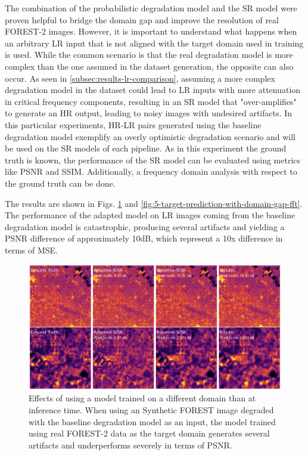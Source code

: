         The combination of the probabilistic degradation model and the SR model were proven helpful to bridge the domain gap and improve the resolution of real FOREST-2 images.
        However, it is important to understand what happens when an arbitrary LR input that is not aligned with the target domain used in training is used.
        While the common scenario is that the real degradation model is more complex than the one assumed in the dataset generation, the opposite can also occur.
        As seen in \ref{subsec:results-lr-comparison}, assuming a more complex degradation model in the dataset could lead to LR inputs with more attenuation in critical frequency components, resulting in an SR model that "over-amplifies" to generate an HR output, leading to noisy images with undesired artifacts.
        In this particular experiments, HR-LR pairs generated using the baseline degradation model exemplify an overly optimistic degradation scenario and will be used on the SR models of each pipeline.
        As in this experiment the ground truth is known, the performance of the SR model can be evaluated using metrics like PSNR and SSIM. Additionally, a frequency domain analysis with respect to the ground truth can be done.
        
        The results are shown in Figs. \ref{fig:5-target-prediction-with-domain-gap} and \ref{fig:5-target-prediction-with-domain-gap-fft}.
        The performance of the adapted model on LR images coming from the baseline degradation model is catastrophic, producing several artifacts and yielding a PSNR difference of approximately 10dB, which represent a 10x difference in terms of MSE.

        \begin{figure}[H]
            \centering
            \includegraphics[scale=0.28]{Includes/5-target_prediction_sample-with-domain-gap.pdf}
            \caption{Effects of using a model trained  on a different domain than at inference time. 
                     When using an Synthetic FOREST image degraded with the baseline degradation model as an input, the model trained using real FOREST-2 data as the target domain generates several artifacts and underperforms severely in terms of PSNR. }
            \label{fig:5-target-prediction-with-domain-gap}
        \end{figure}

